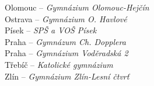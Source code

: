 {\begin{multicols}{2}
\columnbreak

\noindent
Olomouc -- {\it Gymnázium Olomouc-Hejčín} \\
Ostrava -- {\it Gymnázium O. Havlové} \\
Písek -- {\it SPŠ a VOŠ Písek} \\
Praha -- {\it Gymnázum Ch. Dopplera} \\
Praha -- {\it Gymnázium Voděradská 2} \\
Třebíč -- {\it Katolické gymnázium} \\
Zlín -- {\it Gymnázium Zlín-Lesní čtvrť}
\end{multicols}
}

